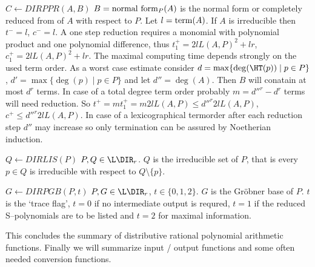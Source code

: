 \begin{deflist}{$C \gets DIRPPR(A,B)$}
     $B = {\rm normal \ form}_P(A) $ is the normal form
     or completely reduced from of $A$ with respect to $P$.
     Let $l = {\rm term}(A)$. 
     If $A$ is irreducible then $t^- = l$, $c^- = l$.  
     A one step reduction requires a monomial with 
     polynomial product and one polynomial difference,
     thus $t_1^+ = 2 l L(A,P)^2 + lr$, $c_1^+ = 2 l L(A,P)^2 +lr$.  
     The maximal computing time 
     depends strongly on the used term order.
     As a worst case estimate  
     consider $d = \max \{ \deg( \HT(p) ) \mid p \in P \}$, 
     $d' = \max \{ \deg( p ) \mid p \in P \}$  
     and let $d'' = \deg(A)$. 
     Then $B$ will conatain at most $d^r$ terms. 
     In case of a total degree term order  
     probably $m = d''^r - d^r$ terms will need reduction.   
     So $t^+ = m t_1^+ = m 2 l L(A,P) \leq d''^r 2 l L(A,P)$,  
     $c^+ \leq d''^r 2 l L(A,P)$. 
     In case of a lexicographical termorder 
     after each reduction step $d''$ may increase so 
     only termination can be assured by Noetherian induction.
\item[$Q \gets DIRLIS(P)$] $P, Q \in \L\DIR_r$. 
     $Q$ is the irreducible set of $P$, that is every 
     $p \in Q$ is irreducible with respect to 
     $Q \setminus \{ p \}$.
\item[$G \gets DIRPGB(P,t)$] $P, G \in \L\DIR_r$, 
     $t \in \{ 0, 1, 2 \}$. 
     $G$ is the Gr\"obner base of $P$.
     $t$ is the `trace flag', $t = 0$ if no intermediate 
     output is requred, $t = 1$ if the reduced S--polynomials 
     are to be listed and $t = 2$ for maximal information.
\end{deflist}

This concludes the summary of 
distributive rational polynomial arithmetic functions.
Finally we will summarize input / output functions and 
some often needed conversion functions. 

